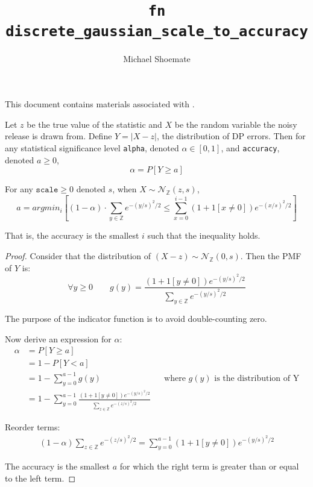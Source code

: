 \documentclass{article}
\title{\texttt{fn discrete\_gaussian\_scale\_to\_accuracy}}
\author{Michael Shoemate}
\begin{document}
\maketitle

This document contains materials associated with .

\begin{definition}
    Let $z$ be the true value of the statistic and $X$ be the random variable the noisy release is drawn from.
    Define $Y = |X - z|$, the distribution of DP errors.
    Then for any statistical significance level \texttt{alpha}, denoted $\alpha \in [0, 1]$, and \texttt{accuracy}, denoted $a \ge 0$,
    \begin{equation}
        \alpha = P[Y \ge a]
    \end{equation}
\end{definition}

\begin{theorem}
    For any $\texttt{scale} \ge 0$ denoted $s$, when $X \sim \mathcal{N}_\mathbb{Z}(z, s)$,
    \begin{equation}
        a = argmin_i \left[(1 - \alpha) \cdot \sum_{y\in \mathbb{Z}} e^{-(y/s)^2/2}
        \le \sum_{x=0}^{i - 1} (1 + 1[x \ne 0]) e^{-(x/s)^2/2} \right]
    \end{equation}

    That is, the accuracy is the smallest $i$ such that the inequality holds.
\end{theorem}

\begin{proof}

Consider that the distribution of $(X - z) \sim \mathcal{N}_\mathbb{Z}(0, s)$.
Then the PMF of $Y$ is:
\begin{equation}
    \forall y \ge 0 \qquad g(y) = \frac{(1 + 1[y \ne 0]) e^{-(y/s)^2/2}}{\sum_{y \in \mathbb{Z}} e^{-(y/s)^2/2} }
\end{equation}

The purpose of the indicator function is to avoid double-counting zero.

Now derive an expression for $\alpha$:
\begin{align*}
    \alpha &= P[Y \ge a] \\
    &= 1 - P[Y < a] \\
    &= 1 - \sum_{y=0}^{a - 1} g(y) && \text{where $g(y)$ is the distribution of Y} \\
    &= 1 - \sum_{y=0}^{a - 1} \frac{(1 + 1[y \ne 0]) e^{-(y/s)^2/2}}{\sum_{z \in \mathbb{Z}} e^{-(z/s)^2/2} }
\end{align*}

Reorder terms:
\begin{align*}
    (1 - \alpha) \sum_{z \in \mathbb{Z}} e^{-(z/s)^2/2} = \sum_{y=0}^{a - 1} (1 + 1[y \ne 0]) e^{-(y/s)^2/2}
\end{align*}

The accuracy is the smallest $a$ for which the right term is greater than or equal to the left term.
\end{proof}
\end{document}
